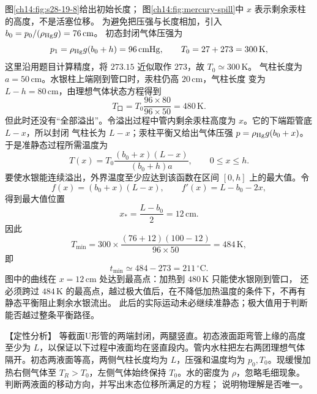 {\begin{xesolution}
图\ref{ch14:fig:s28-19-8}给出初始长度；
图\ref{ch14:fig:mercury-spill}中 $x$ 表示剩余汞柱的高度，不是活塞位移。
为避免把压强与长度相加，引入 $b_0=p_0/(\rho_{\rm Hg}g)=76\,\mathrm{cm}$。
初态封闭气体压强为
\begin{equation}
  p_1=\rho_{\rm Hg}g(b_0+h)=96\,\mathrm{cmHg},\qquad T_0=27+273=300\,\mathrm K,
\end{equation}
这里沿用题目计算精度，将 $273.15$ 近似取作 $273$，故 $T_0\simeq300\,\mathrm K$。
气柱长度为 $a=50\,\mathrm{cm}$。水银柱上端刚到管口时，汞柱仍高 $20\,\mathrm{cm}$，气柱长度
变为 $L-h=80\,\mathrm{cm}$，由理想气体状态方程得到
\begin{equation}
  T_{\text{口}}=T_0\frac{96\times80}{96\times50}=480\,\mathrm K.
\end{equation}
但此时还没有“全部溢出”。令溢出过程中管内剩余汞柱高度为 $x$。它的下端距管底 $L-x$，所以封闭
气柱长为 $L-x$；汞柱平衡又给出气体压强 $p=\rho_{\rm Hg}g(b_0+x)$。于是准静态过程所需温度为
\begin{equation}
  T(x)=T_0\frac{(b_0+x)(L-x)}{(b_0+h)a},\qquad 0\le x\le h.
\end{equation}
要使水银能连续溢出，外界温度至少应达到该函数在区间 $[0,h]$ 上的最大值。令
\begin{equation}
  f(x)=(b_0+x)(L-x),\qquad
  f'(x)=L-b_0-2x,
\end{equation}
得到最大值位置
\begin{equation}
  x_*=\frac{L-b_0}{2}=12\,\mathrm{cm}.
\end{equation}
因此
\begin{equation}
  T_{\min}=300\times\frac{(76+12)(100-12)}{96\times50}
  =484\,\mathrm K,
\end{equation}
即
\begin{equation}
  \boxed{t_{\min}\simeq484-273=211\,{}^\circ\mathrm C}.
\end{equation}
图中的曲线在 $x=12\,\mathrm{cm}$ 处达到最高点：加热到 $480\,\mathrm K$ 只能使水银刚到管口，
还必须跨过 $484\,\mathrm K$ 的最高点，越过极大值后，在不降低加热温度的条件下，不再有静态平衡阻止剩余水银流出。
此后的实际运动未必继续准静态；极大值用于判断能否越过整条平衡路径。
\end{xesolution}

\begin{origexamplebox}{【定性分析】}\label{ch14:ex:s28-19-9}
等截面U形管的两端封闭，两腿竖直。初态液面距弯管上缘的高度至少为 $L$，以保证以下过程中液面均在竖直段内。管内水柱把左右两团理想气体隔开。初态两液面等高，两侧气柱长度均为
$L$，压强和温度均为 $p_0,T_0$。现缓慢加热右侧气体至 $T_R>T_0$，左侧气体始终保持
$T_0$。水的密度为 $\rho$，忽略毛细现象。判断两液面的移动方向，并写出末态位移所满足的方程；
说明物理解是否唯一。



\end{origexamplebox}}
